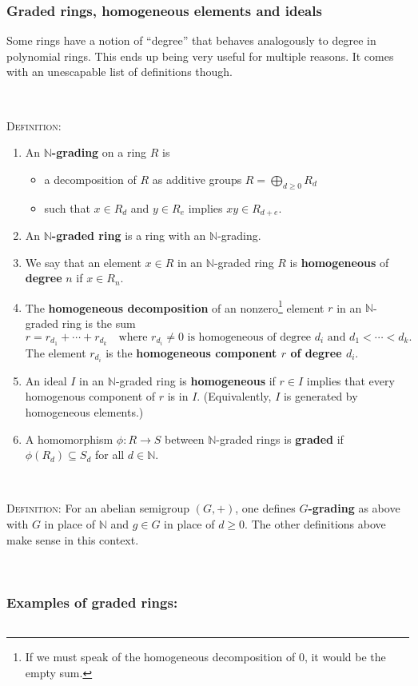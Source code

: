 \documentclass[12pt]{amsart}
\newcommand{\N}{\mathbb{N}}
\newcommand{\0}{$\phantom{.}$}
\newcommand{\1}{\mathbbm{1}}
\newcommand{\sssec}[1]{\subsubsection*{#1}}
\begin{document}
\sssec{Graded rings, homogeneous elements and ideals} Some rings have a notion of ``degree'' that behaves analogously to degree in polynomial rings. This ends up being very useful for multiple reasons. It comes with an unescapable list of definitions though.

\

\noindent \textsc{Definition:} 
\begin{enumerate}
\item An \textbf{$\N$-grading} on a ring $R$ is 
\begin{itemize}
\item a decomposition of $R$ as additive groups $R= \bigoplus_{d\geq 0} R_d$
\item such that $x\in R_d$ and $y\in R_e$ implies $xy\in R_{d+e}$. 
\end{itemize}
\item An \textbf{$\N$-graded ring} is a ring with an $\N$-grading.

\item We say that an element $x\in R$ in an $\N$-graded ring $R$ is \textbf{homogeneous} of \textbf{degree} $n$ if $x\in R_n$.

\item The \textbf{homogeneous decomposition} of an nonzero\footnote{If we must speak of the homogeneous decomposition of $0$, it would be the empty sum.} element $r$ in an $\N$-graded ring is the sum
\[ r = r_{d_1} + \cdots + r_{d_k} \quad \text{where $r_{d_i}\neq 0$ is homogeneous of degree $d_i$ and $d_1<\cdots < d_k$}.\]
The element $r_{d_i}$ is the \textbf{homogeneous component $r$ of degree $d_i$}.

\item An ideal $I$ in an $\N$-graded ring is \textbf{homogeneous} if $r\in I$ implies that every homogenous component of $r$ is in $I$. (Equivalently, $I$ is generated by homogeneous elements.)
\item A homomorphism $\phi:R\to S$ between $\N$-graded rings is \textbf{graded} if $\phi(R_d) \subseteq S_d$ for all $d\in \N$.
\end{enumerate}

\

\noindent \textsc{Definition:} For an abelian semigroup $(G,+)$, one defines \textbf{$G$-grading} as above with $G$ in place of $\N$ and $g\in G$ in place of $d\geq 0$. The other definitions above make sense in this context.

\

\sssec{Examples of graded rings:} \0
\end{document}
